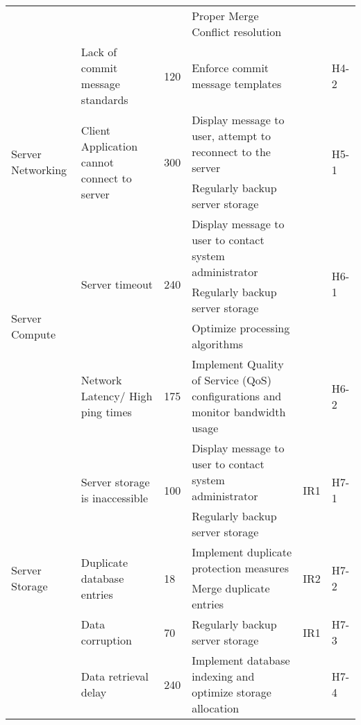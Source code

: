 \documentclass{article}
\begin{document}
\begin{landscape}
\begin{table}[hp]
{\begin{tabular}{|l|l|l|l|l|l|}
        &  &  & Proper Merge Conflict resolution &  &  \\ \cline{2-6} 
        & Lack of commit message standards & 120 & Enforce commit message templates &  & H4-2 \\ \hline
    \multirow{3}{*}{Server Networking} & \multirow{3}{*}{Client Application cannot connect to server} & \multirow{3}{*}{300} & Display message to user, attempt to reconnect to the server & \multirow{3}{*}{} & \multirow{3}{*}{H5-1} \\
        &  &  & \multirow{2}{*}{Regularly backup server storage} &  &  \\
        &  &  &  &  &  \\ \hline
    \multirow{4}{*}{Server Compute} & \multirow{3}{*}{Server timeout} & \multirow{3}{*}{240} & Display message to user to contact system administrator & \multirow{3}{*}{} & \multirow{3}{*}{H6-1} \\
        &  &  & Regularly backup server storage &  &  \\
        &  &  & Optimize processing algorithms &  &  \\ \cline{2-6} 
        & Network Latency/ High ping times & 175 & Implement Quality of Service (QoS) configurations and monitor bandwidth usage &  & H6-2 \\ \hline
    \multirow{7}{*}{Server Storage} & \multirow{2}{*}{Server storage is inaccessible} & \multirow{2}{*}{100} & Display message to user to contact system administrator & \multirow{2}{*}{IR1} & \multirow{2}{*}{H7-1} \\
        &  &  & Regularly backup server storage &  &  \\ \cline{2-6} 
        & \multirow{2}{*}{Duplicate database entries} & \multirow{2}{*}{18} & Implement duplicate protection measures & \multirow{2}{*}{IR2} & \multirow{2}{*}{H7-2} \\
        &  &  & Merge duplicate entries &  &  \\ \cline{2-6} 
        & \multirow{2}{*}{Data corruption} & \multirow{2}{*}{70} & \multirow{2}{*}{Regularly backup server storage} & \multirow{2}{*}{IR1} & \multirow{2}{*}{H7-3} \\
        &  &  &  &  &  \\ \cline{2-6} 
        & Data retrieval delay & 240 & Implement database indexing and optimize storage allocation &  & H7-4 \\ \hline
    \end{tabular}
    }
\end{table}
\end{landscape}
\end{document}
